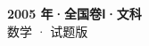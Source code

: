 \documentclass[zihao=-4, a4paper]{ctexart}
\begin{document}
\begin{center}
  {\Large\bfseries 2005 年·全国卷Ⅰ·文科}\\[4pt]
  {\large 数学 · 试题版}
\end{center}
\medskip
{}

\end{document}
